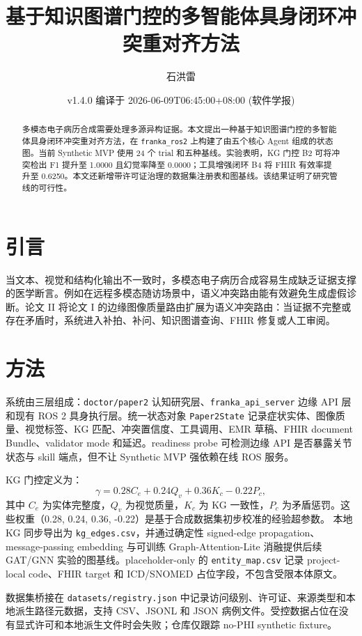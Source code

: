 \documentclass[11pt]{article}
\title{基于知识图谱门控的多智能体具身闭环冲突重对齐方法}
\author{石洪雷}
\date{v1.4.0 编译于 2026-06-09T06:45:00+08:00 (软件学报)}
\begin{document}
\maketitle

\begin{abstract}
多模态电子病历合成需要处理多源异构证据。本文提出一种基于知识图谱门控的多智能体具身闭环冲突重对齐方法，在 \texttt{franka\_ros2} 上构建了由五个核心 Agent 组成的状态图。当前 Synthetic MVP 使用 24 个 trial 和五种基线。实验表明，KG 门控 B2 可将冲突检出 F1 提升至 1.0000 且幻觉率降至 0.0000；工具增强闭环 B4 将 FHIR 有效率提升至 0.6250。本文还新增带许可证治理的数据集注册表和图基线。该结果证明了研究管线的可行性。
\end{abstract}

\section{引言}
当文本、视觉和结构化输出不一致时，多模态电子病历合成容易生成缺乏证据支撑的医学断言。例如在远程多模态随访场景中，语义冲突路由能有效避免生成虚假诊断。论文 II 将论文 I 的边缘图像质量路由扩展为语义冲突路由：当证据不完整或存在矛盾时，系统进入补拍、补问、知识图谱查询、FHIR 修复或人工审阅。

\section{方法}
系统由三层组成：\texttt{doctor/paper2} 认知研究层、\texttt{franka\_api\_server} 边缘 API 层和现有 ROS 2 具身执行层。统一状态对象 \texttt{Paper2State} 记录症状实体、图像质量、视觉标签、KG 匹配、冲突置信度、工具调用、EMR 草稿、FHIR document Bundle、validator mode 和延迟。readiness probe 可检测边缘 API 是否暴露关节状态与 skill 端点，但不让 Synthetic MVP 强依赖在线 ROS 服务。

KG 门控定义为：
\begin{equation}
\gamma = 0.28 C_e + 0.24 Q_v + 0.36 K_c - 0.22 P_c,
\end{equation}
其中 $C_e$ 为实体完整度，$Q_v$ 为视觉质量，$K_c$ 为 KG 一致性，$P_c$ 为矛盾惩罚。这些权重（0.28, 0.24, 0.36, -0.22）是基于合成数据集初步校准的经验超参数。
本地 KG 同步导出为 \texttt{kg\_edges.csv}，并通过确定性 signed-edge propagation、message-passing embedding 与可训练 Graph-Attention-Lite 消融提供后续 GAT/GNN 实验的图基线。placeholder-only 的 \texttt{entity\_map.csv} 记录 project-local code、FHIR target 和 ICD/SNOMED 占位字段，不包含受限本体原文。

数据集桥接在 \texttt{datasets/registry.json} 中记录访问级别、许可证、来源类型和本地派生路径元数据，支持 CSV、JSONL 和 JSON 病例文件。受控数据占位在没有显式许可和本地派生文件时会失败；仓库仅跟踪 no-PHI synthetic fixture。
\end{document}
